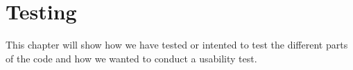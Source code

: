 \chapter{Testing}\label{cha:testing}
This chapter will show how we have tested or intented to test the different parts of the code and how we wanted to conduct a usability test.



